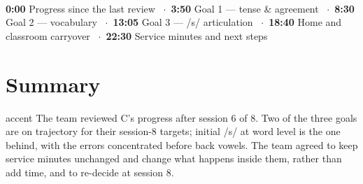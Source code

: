 \documentclass[10pt,a4paper]{article}
\begin{document}
\vspace{1pt}
\noindent{}\\[1pt]
{\scriptsize\color{fog}\textbf{0:00} Progress since the last review \ $\cdot$\ \textbf{3:50} Goal 1 --- tense \& agreement \ $\cdot$\ \textbf{8:30} Goal 2 --- vocabulary \ $\cdot$\ \textbf{13:05} Goal 3 --- /s/ articulation \ $\cdot$\ \textbf{18:40} Home and classroom carryover \ $\cdot$\ \textbf{22:30} Service minutes and next steps}

\section{Summary}

\begin{secbox}{accent}
{\small The team reviewed C's progress after session 6 of 8. Two of the three goals are on trajectory for
their session-8 targets; initial /s/ at word level is the one behind, with the errors concentrated before
back vowels. The team agreed to keep service minutes unchanged and change what happens inside them,
rather than add time, and to re-decide at session 8.}
\end{secbox}

\end{document}
